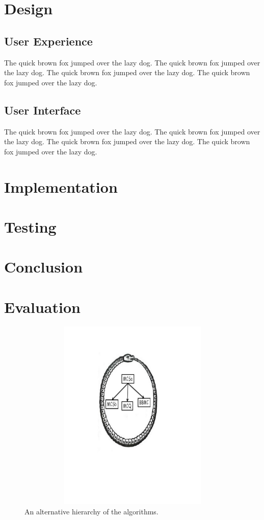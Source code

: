 \documentclass{l4proj}
\begin{document}
\chapter{Design}
\section{User Experience}
The quick brown fox jumped over the lazy dog.
The quick brown fox jumped over the lazy dog.
The quick brown fox jumped over the lazy dog.
The quick brown fox jumped over the lazy dog.
\section{User Interface}
The quick brown fox jumped over the lazy dog.
The quick brown fox jumped over the lazy dog.
The quick brown fox jumped over the lazy dog.
The quick brown fox jumped over the lazy dog.

\chapter{Implementation}
\chapter{Testing}

\chapter{Conclusion}

\chapter{Evaluation}

\begin{figure}
\centering
\includegraphics[height=9.2cm,width=13.2cm]{uroboros.pdf}
\vspace{-30mm}
\caption{An alternative hierarchy of the algorithms.}
\label{uroborus}
\end{figure}
\end{document}
